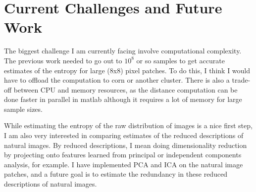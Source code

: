 \documentclass[10pt,twocolumn,letterpaper]{article}
\begin{document}





\section{Current Challenges and Future Work}
The biggest challenge I am currently facing involve computational complexity. The previous work needed to go out to $10^8$ or so samples to get accurate estimates of the entropy for large (8x8) pixel patches. To do this, I think I would have to offload the computation to corn or another cluster. There is also a trade-off between CPU and memory resources, as the distance computation can be done faster in parallel in matlab although it requires a lot of memory for large sample sizes.

While estimating the entropy of the raw distribution of images is a nice first step, I am also very interested in comparing estimates of the reduced descriptions of natural images. By reduced descriptions, I mean doing dimensionality reduction by projecting onto features learned from principal or independent components analysis, for example. I have implemented PCA and ICA on the natural image patches, and a future goal is to estimate the redundancy in these reduced descriptions of natural images.





\end{document}
